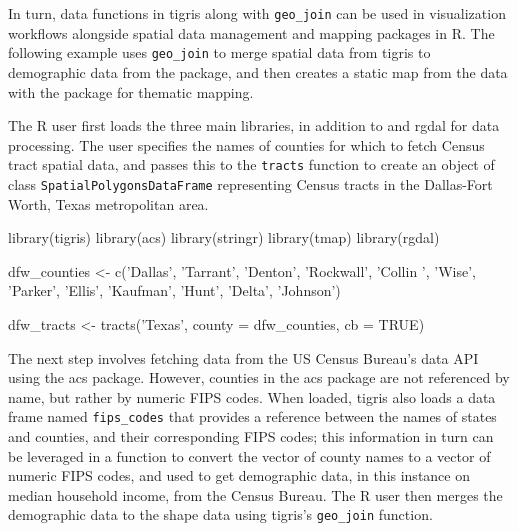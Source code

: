 In turn, data functions in tigris along with \texttt{geo\_join} can be
used in visualization workflows alongside spatial data management and
mapping packages in R. The following example uses \texttt{geo\_join} to
merge spatial data from tigris to demographic data from the
 package, and then creates a static map from the data with
the  package for thematic mapping.

The R user first loads the three main libraries, in addition to
 and rgdal for data processing. The user specifies the
names of counties for which to fetch Census tract spatial data, and
passes this to the \texttt{tracts} function to create an object of class
\texttt{SpatialPolygonsDataFrame} representing Census tracts in the
Dallas-Fort Worth, Texas metropolitan area.

\begin{Schunk}
\begin{Sinput}
library(tigris)
library(acs)
library(stringr)
library(tmap)
library(rgdal)

dfw_counties <- c('Dallas', 'Tarrant', 'Denton', 'Rockwall', 'Collin ', 
                  'Wise', 'Parker', 'Ellis', 'Kaufman', 'Hunt', 'Delta', 'Johnson')

dfw_tracts <- tracts('Texas', county = dfw_counties, cb = TRUE)
\end{Sinput}
\end{Schunk}

The next step involves fetching data from the US Census Bureau's data
API using the acs package. However, counties in the acs package are not
referenced by name, but rather by numeric FIPS codes. When loaded,
tigris also loads a data frame named \texttt{fips\_codes} that provides
a reference between the names of states and counties, and their
corresponding FIPS codes; this information in turn can be leveraged in a
function to convert the vector of county names to a vector of numeric
FIPS codes, and used to get demographic data, in this instance on median
household income, from the Census Bureau. The R user then merges the
demographic data to the shape data using tigris's \texttt{geo\_join}
function.

